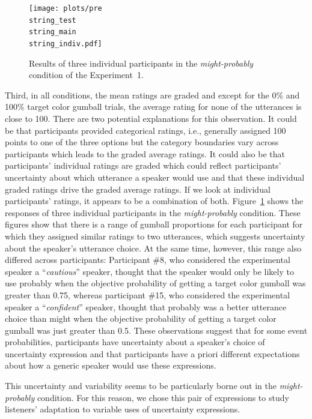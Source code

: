 \documentclass[man, floatsintext]{apa6}
\begin{document}
\begin{figure}
\texttt{[image: plots/pre\\string\_test\\string\_main\\string\_indiv.pdf]}
\caption{Results of three individual participants in the \emph{might-probably} condition of the Experiment~1. \label{fig:norming-results-indiv}}
\end{figure}


Third, in all conditions, the mean ratings are graded and except for the 0\% and 100\% target color gumball trials, the average rating for none of the
utterances is close to 100. There are two potential explanations for this observation. It could be that participants provided categorical ratings, i.e.,
generally assigned 100 points to one of the three options but the category boundaries vary across participants which leads to the graded average ratings.
It could also be that participants' individual ratings are graded which could reflect participants' uncertainty about which utterance a speaker would use 
and that these individual graded ratings drive the  graded average ratings. If we look at individual participants' ratings, it appears to be a combination of both.
Figure~\ref{fig:norming-results-indiv} shows the responses of three individual participants in the \emph{might-probably} condition. These figures show that there 
is a range of gumball proportions for each participant for which they assigned similar ratings to two utterances, which suggests uncertainty about the speaker's 
utterance choice. At the same time, however, this range also differed across participants: Participant \#8, who considered the experimental speaker a 
``\textit{cautious}'' speaker, thought that the speaker would only be likely to use {\sc probably} 
when the objective probability of getting a target color gumball was greater than 0.75, whereas participant \#15, who considered the experimental speaker a ``\textit{confident}'' speaker, thought that  {\sc probably} was a better utterance choice than {\sc might} 
when the objective probability of getting a target color gumball was just greater than 0.5. These observations suggest that for some event probabilities, participants have uncertainty  about a 
speaker's choice of uncertainty expression and that participants have a priori different expectations about how a generic speaker would use these expressions.

This uncertainty and variability seems to be particularly borne out in the \emph{might-probably} condition. For this reason, we chose this pair of expressions
to study listeners' adaptation to variable uses of uncertainty expressions.
\end{document}
